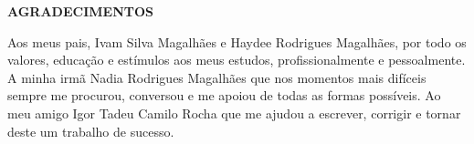 \begin{center}
	\normalsize
	\textbf{AGRADECIMENTOS}
\end{center}

Aos meus pais, Ivam Silva Magalhães e Haydee Rodrigues Magalhães, por todo os valores, educação e estímulos aos meus estudos, profissionalmente e pessoalmente. A minha irmã Nadia Rodrigues Magalhães que nos momentos mais difíceis sempre me procurou, conversou e me apoiou de todas as formas possíveis. Ao meu amigo Igor Tadeu Camilo Rocha que me ajudou a escrever, corrigir e tornar deste um trabalho de sucesso.